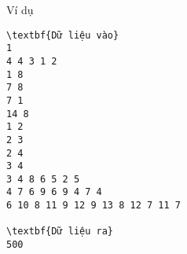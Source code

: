 Ví dụ
\begin{verbatim}
\textbf{Dữ liệu vào}
1
4 4 3 1 2
1 8
7 8
7 1
14 8
1 2
2 3
2 4
3 4
3 4 8 6 5 2 5
4 7 6 9 6 9 4 7 4
6 10 8 11 9 12 9 13 8 12 7 11 7	

\textbf{Dữ liệu ra}
500
\end{verbatim}